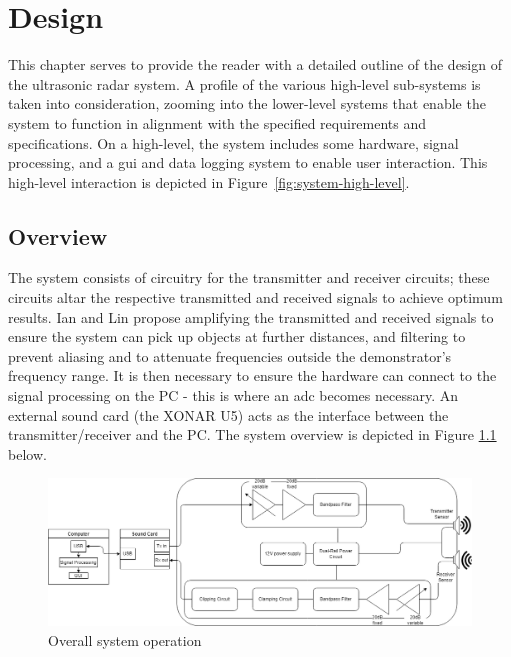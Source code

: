 \documentclass[class=report,11pt,crop=false]{standalone}
\begin{document}
\ifstandalone
\tableofcontents
\fi
\chapter{Design \label{ch:design}}
\vspace{-1cm}

This chapter serves to provide the reader with a detailed outline of the design of the ultrasonic radar system. A profile of the various high-level sub-systems is taken into consideration, zooming into the lower-level systems that enable the system to function in alignment with the specified requirements and specifications. On a high-level, the system includes some hardware, signal processing, and a
\gls{gui} and data logging system to enable user interaction. This high-level interaction is depicted in Figure~\ref{fig:system-high-level}.

\section{Overview}
The system consists of circuitry for the transmitter and receiver circuits; these circuits altar the respective transmitted and received signals to achieve optimum results. Ian \cite{ian} and Lin \cite{clin} propose amplifying the transmitted and received signals to ensure the system can pick up objects at further distances, and filtering to prevent aliasing and to attenuate frequencies outside the demonstrator's frequency range. It is then necessary to ensure the hardware can connect to the signal processing on the PC - this is where an \gls{adc} becomes necessary. An external sound card (the XONAR U5) acts as the interface between the transmitter/receiver and the PC. The system overview is depicted in Figure \ref{fig:overall-system-design} below.

\begin{figure}[htbp]
    \centering
    \includegraphics[width=1\columnwidth]{../Images/system_design.png}
    \caption{Overall system operation}
    \label{fig:overall-system-design}
\end{figure}
\end{document}
